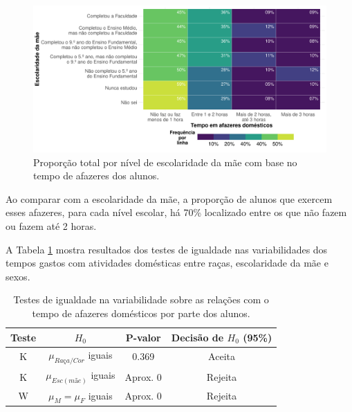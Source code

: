 \newpage
\begin{figure}[h]
    \caption{Proporção total por nível de escolaridade da mãe
    com base no tempo de afazeres dos alunos.\label{esc_mae_afazeres}}
    \begin{center}
        \includegraphics[width=16cm]{img/esc_mae_afazeres.pdf}
    \end{center}
\end{figure}

Ao comparar com a escolaridade da mãe, a proporção de alunos que exercem esses afazeres,
para cada nível escolar, há 70\% localizado entre os que não fazem ou fazem até 2 horas.

\newpage
A Tabela \ref{tab:af_var} mostra resultados dos testes de
igualdade nas variabilidades dos tempos gastos com atividades domésticas entre raças,
escolaridade da mãe e sexos.
\begin{table}[htb]
    \caption{Testes de igualdade na variabilidade sobre as relações 
            com o tempo de afazeres domésticos por parte dos alunos.}
            \label{tab:af_var}
        \centering
        \begin{tabular}{cccc}
        \toprule
        Teste & $H_0$& P-valor & Decisão de $H_0$ (95\%)\\
        \midrule \midrule
        K & $\mu_{Raça/Cor}$ iguais & 0.369 & Aceita\\
        K & $\mu_{Esc(mãe)}$ iguais & Aprox. 0 & Rejeita\\
        W & $\mu_M = \mu_F$ iguais & Aprox. 0 & Rejeita\\
        \bottomrule
        \end{tabular}
\end{table}


